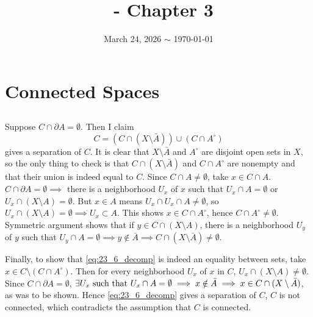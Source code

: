 \documentclass[12pt]{article}
\title{\course\ - Chapter 3}
\author{\myname}
\date{March 24, 2026 $\sim$ \today}
\begin{document}
\maketitle
\thispagestyle{fancy}

\setcounter{section}{22}
\section{Connected Spaces}
\setcounter{subsection}{5}
\subsection{}
Suppose $C \cap \partial A = \emptyset$. 
Then I claim 
\begin{equation} \label{eq:23_6_decomp}
  C = (C \cap (X \setminus \bar{A})) \cup (C \cap A^{\circ})
\end{equation}
gives a separation of $C$. 
It is clear that $X \setminus \bar{A}$ and $A^{\circ}$ are disjoint open sets in $X$, so the only thing to check is that $C \cap (X \setminus \bar{A})$ and $C \cap A^{\circ}$ are nonempty and that their union is indeed equal to $C$. 
Since $C \cap A \neq \emptyset$, take $x \in C \cap A$. 
$C \cap \partial{A} = \emptyset \implies$ there is a neighborhood $U_x$ of $x$ such that $U_x \cap A = \emptyset$ or $U_x \cap (X \setminus A) = \emptyset$. 
But $x \in A$ means $U_x \cap U_x \cap A \neq \emptyset$, so $U_x \cap (X \setminus A) = \emptyset \implies U_x \subset A$. 
This shows $x \in C \cap A^{\circ}$, hence $C \cap A^{\circ} \neq \emptyset$. 
Symmetric argument shows that if $y \in C \cap (X \setminus A)$, there is a neighborhood $U_y$ of $y$ such that $U_y \cap A = \emptyset \implies y \notin \bar{A} \implies C \cap (X \setminus \bar{A}) \neq \emptyset$. 

Finally, to show that \eqref{eq:23_6_decomp} is indeed an equality between sets, take $x \in C \setminus (C \cap A^{\circ})$. 
Then for every neighborhood $U_x$ of $x$ in $C$, $U_x \cap (X \setminus A) \neq \emptyset$. 
Since $C \cap \partial{A} = \emptyset$, $\exists U_x \text{ such that } U_x \cap A = \emptyset \implies x \notin \bar{A} \implies x \in C \cap (X \setminus \bar{A})$, as was to be shown. 
Hence \eqref{eq:23_6_decomp} gives a separation of $C$, $C$ is not connected, which contradicts the assumption that $C$ is connected. 

\setcounter{subsection}{11}
\end{document}
